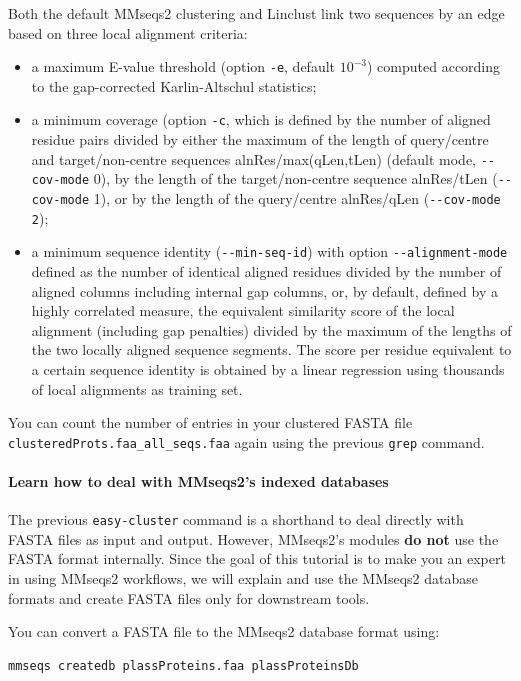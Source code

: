 \documentclass{scrartcl}
\begin{document}
Both the default MMseqs2 clustering and Linclust link two sequences by an edge based on three local alignment criteria:
\begin{itemize}
\item a maximum E-value threshold (option \texttt{-e}, default $10^{-3}$) computed according to the gap-corrected Karlin-Altschul statistics;

\item a minimum coverage (option \texttt{-c}, which is defined by the number of aligned residue pairs divided by either the maximum of the length of query/centre and target/non-centre sequences alnRes/max(qLen,tLen) (default mode, \texttt{-{}-cov-mode} 0), by the length of the target/non-centre sequence alnRes/tLen (\texttt{-{}-cov-mode} 1), or by the length of the query/centre alnRes/qLen (\texttt{-{}-cov-mode 2});

\item a minimum sequence identity (\texttt{-{}-min-seq-id}) with option \texttt{-{}-alignment-mode} defined as the number of identical aligned residues divided by the number of aligned columns including internal gap columns, or, by default, defined by a highly correlated measure, the equivalent similarity score of the local alignment (including gap penalties) divided by the maximum of the lengths of the two locally aligned sequence segments. The score per residue equivalent to a certain sequence identity is obtained by a linear regression using thousands of local alignments as training set.
\end{itemize}

You can count the number of entries in your clustered FASTA file \\ \texttt{clusteredProts.faa\_all\_seqs.faa} again using the previous \texttt{grep} command.

\paragraph{Learn how to deal with MMseqs2's indexed databases} The previous \texttt{easy-cluster} command is a shorthand to deal directly with FASTA files as input and output. However, MMseqs2's modules \textbf{do not} use the FASTA format internally. Since the goal of this tutorial is to make you an expert in using MMseqs2 workflows, we will explain and use the MMseqs2 database formats and create FASTA files only for downstream tools.

You can convert a FASTA file to the MMseqs2 database format using:
\begin{verbatim}
mmseqs createdb plassProteins.faa plassProteinsDb
\end{verbatim}
\end{document}
